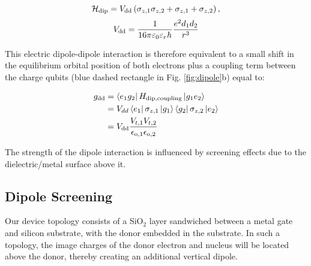 \begin{equation} \label{eq:H_dipdip}
\mathcal{H}_{\rm dip}=V_{\rm dd}\left(\sigma_{z,1}\sigma_{z,2}+\sigma_{z,1}+\sigma_{z,2}\right),
\end{equation}
\begin{equation} \label{eq:V_dd}
V_{\rm dd}=\frac{1}{16\pi\varepsilon_0\varepsilon_r h}\frac{e^2d_1 d_2}{r^3}
\end{equation}

This electric dipole-dipole interaction is therefore equivalent to a small shift in the equilibrium orbital position of both electrons plus a coupling term between the charge qubits (blue dashed rectangle in Fig. \ref{fig:dipole}b) equal to:

\begin{equation}\label{eq:g_dd}
\begin{aligned} 
g_{\rm dd} & =  \bra{e_1g_2}H_{\rm dip, coupling}\ket{g_1e_2}\\
 & =  V_{dd}\bra{e_1}\sigma_{z,1}\ket{g_1}\bra{g_2}\sigma_{z,2}\ket{e_2}\\
 & =   V_{\rm dd}\frac{V_{t,1}V_{t,2}}{\epsilon_{\rm o,1}\epsilon_{\rm o,2}}
\end{aligned}
\end{equation}

The strength of the dipole interaction is influenced by screening effects due to the dielectric/metal surface above it.    

\subsection{Dipole Screening} \label{sec:screening}

Our device topology consists of a SiO$_2$ layer sandwiched between a metal gate and silicon substrate, with the donor embedded in the substrate. In such a topology, the image charges of the donor electron and nucleus will be located above the donor, thereby creating an additional vertical dipole.

